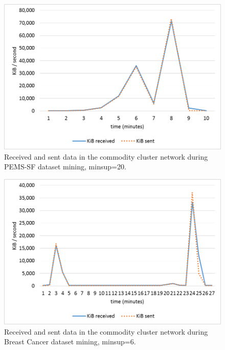 \begin{figure}[!t]
\includegraphics[width=5in]{immagini_extension/comm_cost_pems.png}
\caption{Received and sent data in the commodity cluster network during PEMS-SF dataset mining, minsup=20.}
\label{comm_cost_pems}
\end{figure}

\begin{figure}[!t]
\includegraphics[width=5in]{immagini_extension/comm_cost_breast.png}
\caption{Received and sent data in the commodity cluster network during Breast Cancer dataset mining, minsup=6.}
\label{comm_cost_breast}
\end{figure}

